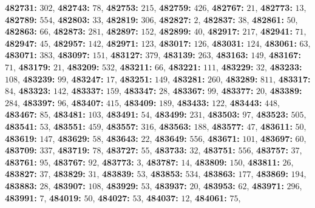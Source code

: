 \textsf{\bfseries 482731:} $302$, \textsf{\bfseries 482743:} $78$, \textsf{\bfseries 482753:} $215$, \textsf{\bfseries 482759:} $426$, \textsf{\bfseries 482767:} $21$, \textsf{\bfseries 482773:} $13$, \textsf{\bfseries 482789:} $554$, \textsf{\bfseries 482803:} $33$, \textsf{\bfseries 482819:} $306$, \textsf{\bfseries 482827:} $2$, \textsf{\bfseries 482837:} $38$, \textsf{\bfseries 482861:} $50$, \textsf{\bfseries 482863:} $66$, \textsf{\bfseries 482873:} $281$, \textsf{\bfseries 482897:} $152$, \textsf{\bfseries 482899:} $40$, \textsf{\bfseries 482917:} $217$, \textsf{\bfseries 482941:} $71$, \textsf{\bfseries 482947:} $45$, \textsf{\bfseries 482957:} $142$, \textsf{\bfseries 482971:} $123$, \textsf{\bfseries 483017:} $126$, \textsf{\bfseries 483031:} $124$, \textsf{\bfseries 483061:} $63$, \textsf{\bfseries 483071:} $383$, \textsf{\bfseries 483097:} $151$, \textsf{\bfseries 483127:} $379$, \textsf{\bfseries 483139:} $263$, \textsf{\bfseries 483163:} $149$, \textsf{\bfseries 483167:} $71$, \textsf{\bfseries 483179:} $21$, \textsf{\bfseries 483209:} $532$, \textsf{\bfseries 483211:} $66$, \textsf{\bfseries 483221:} $111$, \textsf{\bfseries 483229:} $32$, \textsf{\bfseries 483233:} $108$, \textsf{\bfseries 483239:} $99$, \textsf{\bfseries 483247:} $17$, \textsf{\bfseries 483251:} $149$, \textsf{\bfseries 483281:} $260$, \textsf{\bfseries 483289:} $811$, \textsf{\bfseries 483317:} $84$, \textsf{\bfseries 483323:} $142$, \textsf{\bfseries 483337:} $159$, \textsf{\bfseries 483347:} $28$, \textsf{\bfseries 483367:} $99$, \textsf{\bfseries 483377:} $20$, \textsf{\bfseries 483389:} $284$, \textsf{\bfseries 483397:} $96$, \textsf{\bfseries 483407:} $415$, \textsf{\bfseries 483409:} $189$, \textsf{\bfseries 483433:} $122$, \textsf{\bfseries 483443:} $448$, \textsf{\bfseries 483467:} $85$, \textsf{\bfseries 483481:} $103$, \textsf{\bfseries 483491:} $54$, \textsf{\bfseries 483499:} $231$, \textsf{\bfseries 483503:} $97$, \textsf{\bfseries 483523:} $505$, \textsf{\bfseries 483541:} $53$, \textsf{\bfseries 483551:} $459$, \textsf{\bfseries 483557:} $316$, \textsf{\bfseries 483563:} $188$, \textsf{\bfseries 483577:} $47$, \textsf{\bfseries 483611:} $50$, \textsf{\bfseries 483619:} $147$, \textsf{\bfseries 483629:} $58$, \textsf{\bfseries 483643:} $22$, \textsf{\bfseries 483649:} $556$, \textsf{\bfseries 483671:} $101$, \textsf{\bfseries 483697:} $60$, \textsf{\bfseries 483709:} $337$, \textsf{\bfseries 483719:} $78$, \textsf{\bfseries 483727:} $55$, \textsf{\bfseries 483733:} $32$, \textsf{\bfseries 483751:} $556$, \textsf{\bfseries 483757:} $37$, \textsf{\bfseries 483761:} $95$, \textsf{\bfseries 483767:} $92$, \textsf{\bfseries 483773:} $3$, \textsf{\bfseries 483787:} $14$, \textsf{\bfseries 483809:} $150$, \textsf{\bfseries 483811:} $26$, \textsf{\bfseries 483827:} $37$, \textsf{\bfseries 483829:} $31$, \textsf{\bfseries 483839:} $53$, \textsf{\bfseries 483853:} $534$, \textsf{\bfseries 483863:} $177$, \textsf{\bfseries 483869:} $194$, \textsf{\bfseries 483883:} $28$, \textsf{\bfseries 483907:} $108$, \textsf{\bfseries 483929:} $53$, \textsf{\bfseries 483937:} $20$, \textsf{\bfseries 483953:} $62$, \textsf{\bfseries 483971:} $296$, \textsf{\bfseries 483991:} $7$, \textsf{\bfseries 484019:} $50$, \textsf{\bfseries 484027:} $53$, \textsf{\bfseries 484037:} $12$, \textsf{\bfseries 484061:} $75$, 
